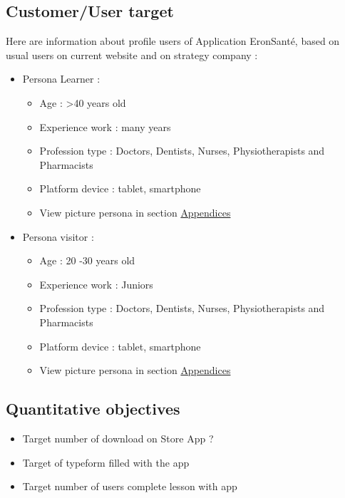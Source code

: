 \documentclass[
  12pt,
]{article}
\providecommand{\tightlist}{%
  \setlength{\itemsep}{0pt}\setlength{\parskip}{0pt}}
\begin{document}
\hypertarget{customeruser-target}{%
\subsection{Customer/User target}\label{customeruser-target}}

Here are information about profile users of Application EronSanté, based
on usual users on current website and on strategy company :

\begin{itemize}
\tightlist
\item
  Persona Learner :

  \begin{itemize}
  \tightlist
  \item
    Age : \textgreater40 years old
  \item
    Experience work : many years
  \item
    Profession type : Doctors, Dentists, Nurses, Physiotherapists and
    Pharmacists
  \item
    Platform device : tablet, smartphone
  \item
    View picture persona in section
    \protect\hyperlink{appendices}{Appendices}
  \end{itemize}
\item
  Persona visitor :

  \begin{itemize}
  \tightlist
  \item
    Age : 20 -30 years old
  \item
    Experience work : Juniors
  \item
    Profession type : Doctors, Dentists, Nurses, Physiotherapists and
    Pharmacists
  \item
    Platform device : tablet, smartphone
  \item
    View picture persona in section
    \protect\hyperlink{appendices}{Appendices}
  \end{itemize}
\end{itemize}

\hypertarget{quantitative-objectives}{%
\subsection{Quantitative objectives}\label{quantitative-objectives}}

\begin{itemize}
\tightlist
\item
  Target number of download on Store App ?
\item
  Target of typeform filled with the app
\item
  Target number of users complete lesson with app
\end{itemize}
\end{document}

